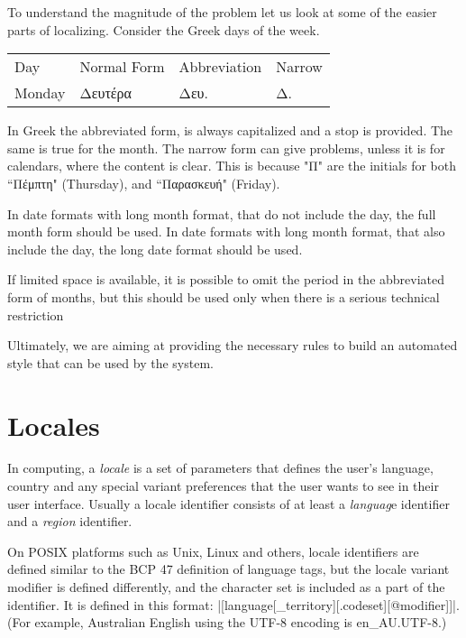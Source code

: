 To understand the magnitude of the problem let us look at some of the easier parts of localizing. Consider the Greek days of the week.
\medskip
\begin{trivlist}\item[]\panunicode
\begin{tabular}{llll}
\toprule
Day &Normal Form &Abbreviation &Narrow\\
Monday &Δευτέρα &Δευ. &Δ. \\
\midrule
\end{tabular}
\end{trivlist}

In Greek the abbreviated form, is always capitalized and a stop is provided. The same is true for the month. The narrow form can give problems, unless it is for calendars, where the content is clear. This is because "{\panunicode Π}" are the initials for both ``{\panunicode Πέμπτη}" (Thursday), and ``{\panunicode Παρασκευή}" (Friday). 

In date formats with long month format, that do not include the day, the full month form should be used.
In date formats with long month format, that also include the day, the long date format should be used.

If limited space is available, it is possible to omit the period in the abbreviated form of months, but this should be used only when there is a serious technical restriction

Ultimately, we are aiming at providing the necessary rules to build an automated style that can be used by the system.
                

\section{Locales}

In computing, a \emph{locale} is a set of parameters that defines the user's language, country and any special variant preferences that the user wants to see in their user interface. Usually a locale identifier consists of at least a \textit{languag}e identifier and a \textit{region} identifier.

On POSIX platforms such as Unix, Linux and others, locale identifiers are defined similar to the BCP 47 definition of language tags, but the locale variant modifier is defined differently, and the character set is included as a part of the identifier. It is defined in this format: |[language[_territory][.codeset][@modifier]]|. (For example, Australian English using the UTF-8 encoding is en\_AU.UTF-8.)

